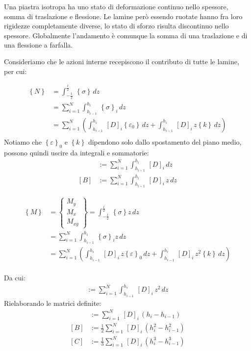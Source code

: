 Una piastra isotropa ha uno stato di deformazione continuo nello spessore, somma di traslazione e flessione. Le lamine però essendo ruotate hanno fra loro rigidezze completamente diverse, lo stato di sforzo risulta discontinuo nello spessore. Globalmente l'andamento è comunque la somma di una traslazione e di una flessione a farfalla.

Consideriamo che le azioni interne recepiscono il contributo di tutte le lamine, per cui:

\begin{align*}
    \left\{N\right\} &= \int_{-\frac{t}{2}}^{\frac{t}{2}}\,  \left\{\sigma\right\} \,dz\\
    &= \sum^N_{i=1}\int_{h_{i-1}}^{h_i}\,  \left\{\sigma\right\}_i \,dz\\
     &= \sum^N_{i=1}\left(\int_{h_{i-1}}^{h_i}\, [D]_i \left\{\varepsilon_0\right\} \,dz       
     +\int_{h_{i-1}}^{h_i}\, [D]_i \,z\left\{k\right\} \,dz           \right)\\
\end{align*}
Notiamo che $ \left\{\varepsilon\right\}_0$ e $\left\{k\right\}  $ dipendono solo dallo spostamento del piano medio, possono quindi uscire da integrali e sommatorie:
\begin{align*}
    [A] &:= \sum^N_{i=1}\int_{h_{i-1}}^{h_i}\,  [D]_i \,dz\\
      [B] &:= \sum^N_{i=1}\int_{h_{i-1}}^{h_i}\,  [D]_i\,z \,dz
\end{align*}

\begin{align*}
    \left\{M\right\} &= \begin{Bmatrix}
        M_y\\M_x\\M_{xy}
    \end{Bmatrix} =\int_{-\frac{t}{2}}^{\frac{t}{2}}\,  \left\{\sigma\right\} z\,dz\\
    &= \sum^N_{i=1}\int_{h_{i-1}}^{h_i}\,  \left\{\sigma\right\}_i z\,dz\\
     &= \sum^N_{i=1}\left(\int_{h_{i-1}}^{h_i}\, [D]_i \,z\left\{\varepsilon\right\}_0 \,dz       
     +\int_{h_{i-1}}^{h_i}\, [D]_i \,z^2\left\{k\right\} \,dz           \right)\\
\end{align*}

Da cui:
\begin{align*}
      [C] := \sum^N_{i=1}\int_{h_{i-1}}^{h_i}\,  [D]_i\,z^2 \,dz
\end{align*}
Rielaborando le matrici definite:
\begin{align*}
    [A] &:= \sum^N_{i=1}\,  [D]_i \,(h_i-h_{i-1})\\
      [B] &:= \frac{1}{2}\sum^N_{i=1}\,  [D]_i \,(h_i^2-h_{i-1}^2)\\
       [C] &:=\frac{1}{3} \sum^N_{i=1}\,  [D]_i \,(h_i^3-h_{i-1}^3)\\
\end{align*}

